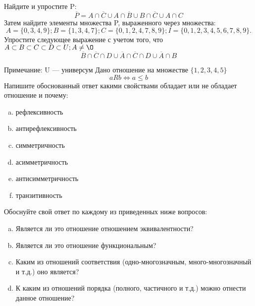 \documentclass[10pt]{exam}
\begin{document}
\begin{questions}
\question
Найдите и упростите P:
\begin{equation*}
\overline{P} = A \cap \overline{C} \cup A \cap \overline{B} \cup B \cap \overline{C} \cup A \cap C
\end{equation*}
Затем найдите элементы множества P, выраженного через множества:
\begin{equation*}
A = \{0, 3, 4, 9\}; 
B = \{1, 3, 4, 7\};
C = \{0, 1, 2, 4, 7, 8, 9\};
I = \{0, 1, 2, 3, 4, 5, 6, 7, 8, 9\}.
\end{equation*}\question
Упростите следующее выражение с учетом того, что $A\subset B \subset C \subset D \subset U; A \neq \O$
\begin{equation*}
\overline{B} \cap \overline{C} \cap D \cup \overline{A} \cap \overline{C} \cap D \cup \overline{A} \cap B
\end{equation*}

Примечание: U — универсум\question
Дано отношение на множестве $\{1, 2, 3, 4, 5\}$ 
\begin{equation*}
aRb \iff a \leq b
\end{equation*}
Напишите обоснованный ответ какими свойствами обладает или не обладает отношение и почему:   
\begin{enumerate} [a)]\setcounter{enumi}{0}
\item рефлексивность
\item антирефлексивность
\item симметричность
\item асимметричность
\item антисимметричность
\item транзитивность
\end{enumerate}

Обоснуйте свой ответ по каждому из приведенных ниже вопросов:
\begin{enumerate} [a)]\setcounter{enumi}{0}
    \item Является ли это отношение отношением эквивалентности?
    \item Является ли это отношение функциональным?
    \item Каким из отношений соответствия (одно-многозначным, много-многозначный и т.д.) оно является?
    \item К каким из отношений порядка (полного, частичного и т.д.) можно отнести данное отношение?
\end{enumerate}



\end{questions}
\end{document}
